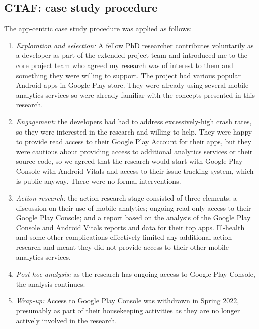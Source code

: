 \subsection{GTAF: case study procedure}
The app-centric case study procedure was applied as follows:
{\small
\begin{enumerate}
    \itemsep0em
    \item \textit{Exploration and selection:} A fellow PhD researcher contributes voluntarily as a developer as part of the extended project team and introduced me to the core project team who agreed my research was of interest to them and something they were willing to support. The project had various popular Android apps in Google Play store. They were already using several mobile analytics services so were already familiar with the concepts presented in this research.
    \item \textit{Engagement:} the developers had had to address excessively-high crash rates, so they were interested in the research and willing to help. They were happy to provide read access to their Google Play Account for their apps, but they were cautious about providing access to additional analytics services or their source code, so we agreed that the research would start with Google Play Console with Android Vitals and access to their issue tracking system, which is public anyway.  There were no formal interventions.
    \item \textit{Action research:} the action research stage consisted of three elements: a discussion on their use of mobile analytics; ongoing read only access to their Google Play Console; and a report based on the analysis of the Google Play Console and Android Vitals reports and data for their top apps. Ill-health and some other complications effectively limited any additional action research and meant they did not provide access to their other mobile analytics services. 
    \item \textit{Post-hoc analysis:} as the research has ongoing access to Google Play Console, the analysis continues.
    \item \textit{Wrap-up:} Access to Google Play Console was withdrawn in Spring 2022, presumably as part of their housekeeping activities as they are no longer actively involved in the research.
\end{enumerate}
}


